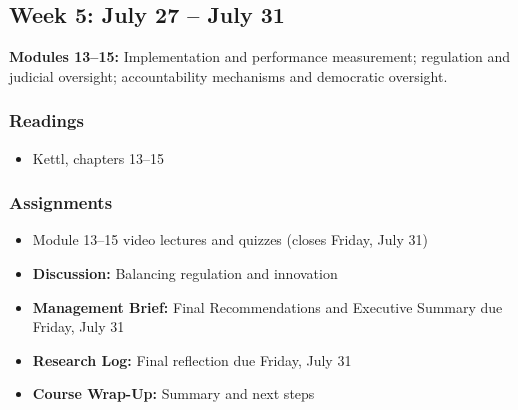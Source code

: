 \documentclass[12pt]{article}
\begin{document}
\subsection*{Week 5: July 27 -- July 31}
\noindent \textbf{Modules 13--15:} Implementation and performance measurement; regulation and judicial oversight; accountability mechanisms and democratic oversight.
\subsubsection*{Readings}
    \begin{itemize}
        \item Kettl, chapters 13--15
    \end{itemize}
\subsubsection*{Assignments}
    \begin{itemize}
        \item Module 13--15 video lectures and quizzes (closes Friday, July 31)
        \item \textbf{Discussion:} Balancing regulation and innovation
        \item \textbf{Management Brief:} Final Recommendations and Executive Summary due Friday, July 31
        \item \textbf{Research Log:} Final reflection due Friday, July 31
        \item \textbf{Course Wrap-Up:} Summary and next steps
    \end{itemize}
\end{document}
